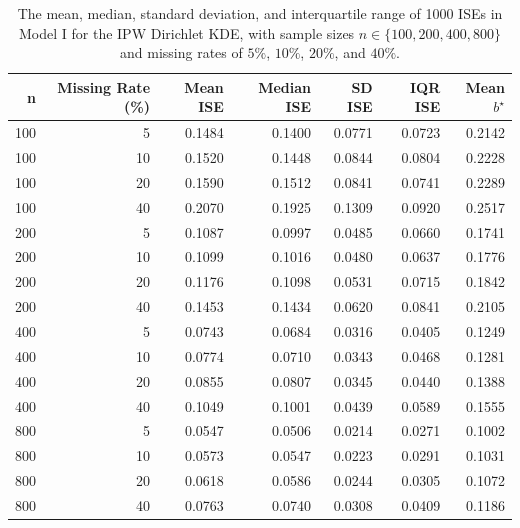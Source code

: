 \begin{table}[H]
\renewcommand{\arraystretch}{1.1}
\centering
\begin{tabular}{rrrrrrr}
\hline
n & Missing Rate (\%) & Mean ISE & Median ISE & SD ISE & IQR ISE & Mean $b^{\star}$ \\
\hline
100 & 5 & 0.1484 & 0.1400 & 0.0771 & 0.0723 & 0.2142 \\
100 & 10 & 0.1520 & 0.1448 & 0.0844 & 0.0804 & 0.2228 \\
100 & 20 & 0.1590 & 0.1512 & 0.0841 & 0.0741 & 0.2289 \\
100 & 40 & 0.2070 & 0.1925 & 0.1309 & 0.0920 & 0.2517 \\
200 & 5 & 0.1087 & 0.0997 & 0.0485 & 0.0660 & 0.1741 \\
200 & 10 & 0.1099 & 0.1016 & 0.0480 & 0.0637 & 0.1776 \\
200 & 20 & 0.1176 & 0.1098 & 0.0531 & 0.0715 & 0.1842 \\
200 & 40 & 0.1453 & 0.1434 & 0.0620 & 0.0841 & 0.2105 \\
400 & 5 & 0.0743 & 0.0684 & 0.0316 & 0.0405 & 0.1249 \\
400 & 10 & 0.0774 & 0.0710 & 0.0343 & 0.0468 & 0.1281 \\
400 & 20 & 0.0855 & 0.0807 & 0.0345 & 0.0440 & 0.1388 \\
400 & 40 & 0.1049 & 0.1001 & 0.0439 & 0.0589 & 0.1555 \\
800 & 5 & 0.0547 & 0.0506 & 0.0214 & 0.0271 & 0.1002 \\
800 & 10 & 0.0573 & 0.0547 & 0.0223 & 0.0291 & 0.1031 \\
800 & 20 & 0.0618 & 0.0586 & 0.0244 & 0.0305 & 0.1072 \\
800 & 40 & 0.0763 & 0.0740 & 0.0308 & 0.0409 & 0.1186 \\
\hline
\end{tabular}
\caption{The mean, median, standard deviation, and interquartile range of 1000 ISEs in Model I for the IPW Dirichlet KDE, with sample sizes $n\in \{100, 200, 400, 800\}$ and missing rates of $5\%$, $10\%$, $20\%$, and $40\%$.}
\label{tab:results_LSCV_Model1}
\end{table}

